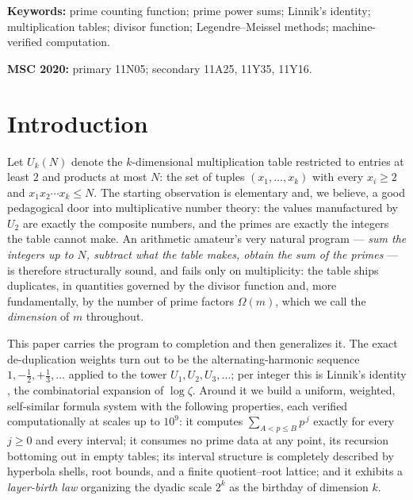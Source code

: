 \documentclass[11pt]{article}
\theoremstyle{remark}
\begin{document}
\medskip
\noindent\textbf{Keywords:} prime counting function; prime power sums; Linnik's identity;
multiplication tables; divisor function; Legendre--Meissel methods; machine-verified computation.

\smallskip
\noindent\textbf{MSC 2020:} primary 11N05; secondary 11A25, 11Y35, 11Y16.

\section{Introduction}

Let $U_k(N)$ denote the $k$-dimensional multiplication table restricted to entries at least $2$ and
products at most $N$: the set of tuples $(x_1, \dots, x_k)$ with every $x_i \ge 2$ and
$x_1 x_2 \cdots x_k \le N$. The starting observation is elementary and, we believe, a good pedagogical
door into multiplicative number theory: the values manufactured by $U_2$ are exactly the composite
numbers, and the primes are exactly the integers the table cannot make. An arithmetic amateur's very
natural program --- \emph{sum the integers up to $N$, subtract what the table makes, obtain the sum of
the primes} --- is therefore structurally sound, and fails only on multiplicity: the table ships
duplicates, in quantities governed by the divisor function and, more fundamentally, by the number of
prime factors $\Omega(m)$, which we call the \emph{dimension} of $m$ throughout.

This paper carries the program to completion and then generalizes it. The exact de-duplication weights
turn out to be the alternating-harmonic sequence $1, -\tfrac12, +\tfrac13, \dots$ applied to the tower
$U_1, U_2, U_3, \dots$; per integer this is Linnik's identity \cite{Linnik,FI}, the combinatorial
expansion of $\log \zeta$. Around it we build a uniform, weighted, self-similar formula system with the
following properties, each verified computationally at scales up to $10^9$: it computes
$\sum_{A < p \le B} p^{\,j}$ exactly for every $j \ge 0$ and every interval; it consumes no prime data at
any point, its recursion bottoming out in empty tables; its interval structure is completely described
by hyperbola shells, root bounds, and a finite quotient--root lattice; and it exhibits a
\emph{layer-birth law} organizing the dyadic scale $2^k$ as the birthday of dimension $k$.
\end{document}
